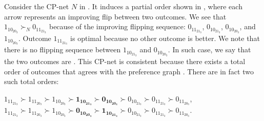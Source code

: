 Consider the CP-net $N$ in .
It induces a partial order shown in ,
where each arrow represents an improving flip between two outcomes.
We see that $1_10_20_3 \succ_N 0_11_21_3$
because of the improving flipping sequence:
$0_11_21_3$, $0_10_21_3$, $0_10_20_3$, and $1_10_20_3$.
Outcome $1_11_21_3$ is optimal because no other outcome is
better.
We note that there is no flipping sequence between
$1_10_21_3$ and $0_10_20_3$.
In such case, we say that the two outcomes are .
This CP-net is consistent because there exists a total order
of outcomes that agrees with the preference graph .
There are in fact two such total orders:

\begin{center}
	$1_11_21_3 \succ 1_11_20_3 \succ 1_10_20_3 
		\succ \bm{1_10_21_3} \succ \bm{0_10_20_3} 
		\succ 0_10_21_3 \succ 0_11_21_3 \succ 0_11_20_3$,\\
	$1_11_21_3 \succ 1_11_20_3 \succ 1_10_20_3
		\succ \bm{0_10_20_3} \succ \bm{1_10_21_3}
		\succ 0_10_21_3 \succ 0_11_21_3 \succ 0_11_20_3$.
\end{center}


